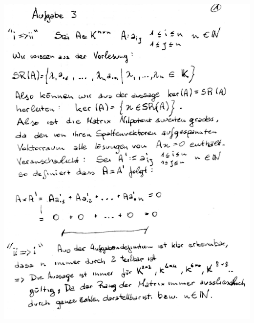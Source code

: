 \documentclass[10pt,a4paper]{article}
\begin{document}
\includegraphics[scale=0.25]{lat1_5.jpg}  \\
\end{document}
